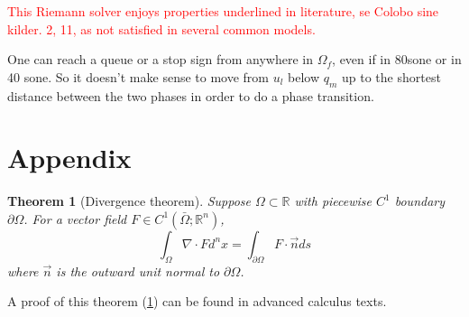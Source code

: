 \documentclass[10pt]{article}
\newtheorem{theorem}{Theorem}[section]
\numberwithin{equation}{section}
\begin{document}
\textcolor{red}{This Riemann solver enjoys properties underlined in literature, se Colobo sine kilder. 2, 11, as not satisfied in several common models.}


One can reach a queue or a stop sign from anywhere in $\Omega_f$, even if in 80sone or in 40 sone. So it doesn't make sense to move from $u_l$ below $q_m$ up to the shortest distance between the two phases in order to do a phase transition. 


\newpage

\appendix
\section{Appendix}

\begin{theorem}[Divergence theorem]
Suppose $\Omega \subset \mathbb{R}$ with piecewise $C^1$ boundary $\partial \Omega$. For a vector field $F \in C^1(\bar \Omega; \mathbb{R}^n)$, 
\begin{equation}
    \int_\Omega \nabla \cdot F d^nx = \int_{\partial \Omega} F \cdot \vec{n} ds
\end{equation}
where $\vec{n} $ is the outward unit normal to $\partial \Omega$.
\label{Thm:Divergence}
\end{theorem}
A proof of this theorem (\ref{Thm:Divergence}) can be found in advanced calculus texts. 


\newpage
\printbibliography
\end{document}
